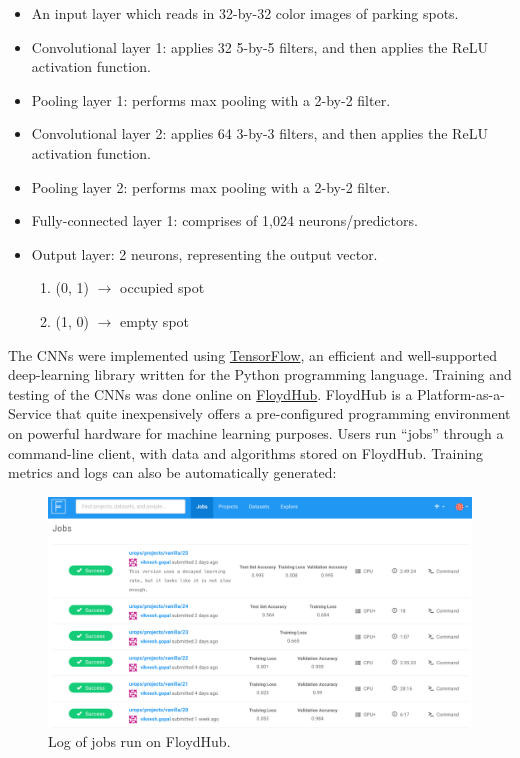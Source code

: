 \documentclass[a4paper, 11pt]{article} %
\begin{document}
	\begin{itemize}
		\item[] An input layer which reads in 32-by-32 color images of parking spots.
		\item[] Convolutional layer 1: applies 32 5-by-5 filters, and then applies the ReLU activation 
		function.
		\item[] Pooling layer 1: performs max pooling with a 2-by-2 filter.
		\item[] Convolutional layer 2: applies 64 3-by-3 filters, and then applies the ReLU activation 
		function.
		\item[] Pooling layer 2: performs max pooling with a 2-by-2 filter.
		\item[] Fully-connected layer 1: comprises of 1,024 neurons/predictors.
		\item[] Output layer: 2 neurons, representing the output vector.
		\vspace*{-4mm}
		\begin{enumerate}
			\setlength\itemsep{-3mm}
			\item[] (0, 1) $\rightarrow$ occupied spot
			\item[] (1, 0) $\rightarrow$ empty spot
		\end{enumerate}
	\end{itemize}
   	The CNNs were implemented using \href{https://www.tensorflow.org}{TensorFlow}, an efficient and 
   	well-supported deep-learning library written for the Python programming language. Training and 
   	testing of the CNNs was done online on \href{https://www.floydhub.com}{FloydHub}. FloydHub is a 
   	Platform-as-a-Service that quite inexpensively offers a pre-configured programming environment on 
   	powerful hardware for machine learning purposes. Users run ``jobs'' through a command-line client, 
   	with data and algorithms stored on FloydHub. Training metrics and logs can also be automatically 
    generated:
    \vskip 5mm
    \begin{figure}[h]
    	\centering
    	\includegraphics[width=14cm]{figures/floydhub.png}
    	\caption{Log of jobs run on FloydHub.}
    \end{figure}
\end{document}
